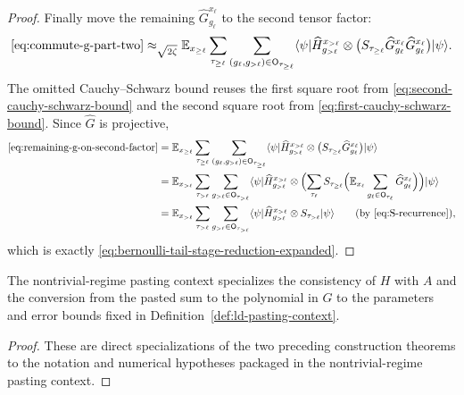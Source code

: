 \begin{proof}
	Finally move the remaining $\widehat G_{g_\ell}^{x_\ell}$ to the second tensor factor:
	\begin{align}
		\eqref{eq:commute-g-part-two}
		\approx_{\sqrt{2\zeta}}
		\mathbb{E}_{x_{\ge \ell}} \sum_{\tau_{\ge \ell}} \sum_{(g_\ell,g_{>\ell})\in \mathsf O_{\tau_{\ge \ell}}}
		\langle \psi \rvert
		\widehat H_{g_{>\ell}}^{x_{>\ell}}
		\otimes \bigl(S_{\tau_{\ge \ell}}\widehat G_{g_\ell}^{x_\ell}\widehat G_{g_\ell}^{x_\ell}\bigr)
		\lvert \psi \rangle.
		\label{eq:remaining-g-on-second-factor}
	\end{align}
	The omitted Cauchy--Schwarz bound reuses the first square root from \ref{eq:second-cauchy-schwarz-bound} and the second square root from \ref{eq:first-cauchy-schwarz-bound}. Since $\widehat G$ is projective,
	\begin{align*}
		\eqref{eq:remaining-g-on-second-factor}
		 & =
		\E_{x_{\ge \ell}} \sum_{\tau_{\ge \ell}} \sum_{(g_\ell,g_{>\ell})\in \mathsf O_{\tau_{\ge \ell}}}
		\bra{\psi}
		\widehat H_{g_{>\ell}}^{x_{>\ell}}
		\ot \bigl(S_{\tau_{\ge \ell}}\widehat G_{g_\ell}^{x_\ell}\bigr)
		\ket{\psi} \\
		 & =
		\E_{x_{>\ell}} \sum_{\tau_{>\ell}} \sum_{g_{>\ell}\in \mathsf O_{\tau_{>\ell}}}
		\bra{\psi}
		\widehat H_{g_{>\ell}}^{x_{>\ell}}
		\ot
		\Bigl(\sum_{\tau_\ell}
		S_{\tau_{\ge \ell}}
		\Bigl(\E_{x_\ell}\sum_{g_\ell\in \mathsf O_{\tau_\ell}} \widehat G_{g_\ell}^{x_\ell}\Bigr)\Bigr)
		\ket{\psi} \\
		 & =
		\E_{x_{>\ell}} \sum_{\tau_{>\ell}} \sum_{g_{>\ell}\in \mathsf O_{\tau_{>\ell}}}
		\bra{\psi}
		\widehat H_{g_{>\ell}}^{x_{>\ell}} \ot S_{\tau_{>\ell}}
		\ket{\psi}
		\tag{by \ref{eq:S-recurrence}},
	\end{align*}
	which is exactly \ref{eq:bernoulli-tail-stage-reduction-expanded}.
\end{proof}

\begin{lemma}\label{lem:pasting-context-specializations}
	\leanok
	The nontrivial-regime pasting context specializes the consistency of $H$ with $A$ and
	the conversion from the pasted sum to the polynomial in $G$ to the parameters
	and error bounds fixed in Definition~\ref{def:ld-pasting-context}.
\end{lemma}
\begin{proof}
	\leanok
	These are direct specializations of the two preceding construction theorems
	to the notation and numerical hypotheses packaged in the nontrivial-regime
	pasting context.
\end{proof}

